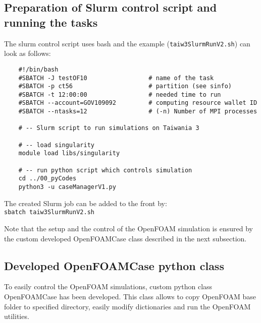 \subsection{Preparation of Slurm control script and running the tasks}
\label{subsec:slurmCtrl}
The slurm control script uses bash and the example (\texttt{taiw3SlurmRunV2.sh}) can look as follows:
\begin{verbatim}
    #!/bin/bash
    #SBATCH -J testOF10                 # name of the task
    #SBATCH -p ct56                     # partition (see sinfo)
    #SBATCH -t 12:00:00                 # needed time to run
    #SBATCH --account=GOV109092         # computing resource wallet ID
    #SBATCH --ntasks=12                 # (-n) Number of MPI processes

    # -- Slurm script to run simulations on Taiwania 3

    # -- load singularity
    module load libs/singularity

    # -- run python script which controls simulation
    cd ../00_pyCodes
    python3 -u caseManagerV1.py
\end{verbatim}

The created Slurm job can be added to the front by:\\[0.2cm]
\indent\quad\quad\texttt{sbatch taiw3SlurmRunV2.sh}

Note that the setup and the control of the OpenFOAM simulation is ensured by the custom developed OpenFOAMCase class described in the next subsection.

\subsection{Developed OpenFOAMCase python class}
\label{subsec:ofCaseClass}
To easily control the OpenFOAM simulations, custom python class OpenFOAMCase has been developed. This class allows to copy OpenFOAM base folder to specified directory, easily modify dictionaries and run the OpenFOAM utilities.

